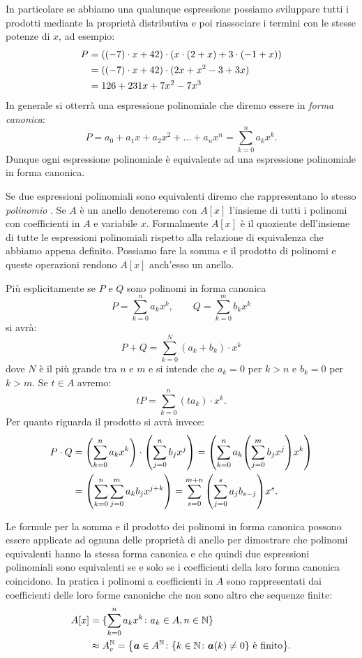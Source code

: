 In particolare se abbiamo una qualunque espressione possiamo sviluppare tutti i prodotti
mediante la proprietà distributiva e poi riassociare i termini 
con le stesse potenze di $x$, ad esempio:
\begin{align*}
P &= {\left( (-7)\cdot x+42 \right)}\cdot(x\cdot (2 + x)
+ 3\cdot(-1+x))\\
&= {\left( (-7)\cdot x + 42 \right)}\cdot (2x+x^2-3+3x) \\
&= 126 + 231 x + 7 x^2 - 7 x^3
\end{align*}
In generale si otterrà una espressione polinomiale che diremo 
essere in \emph{forma canonica}:
\[
  P = a_0 + a_1 x + a_2 x^2 + \dots + a_n x^n
       = \sum_{k=0}^n a_k x^k.
\]
Dunque ogni espressione polinomiale è equivalente ad una 
espressione polinomiale in forma canonica. 

Se due espressioni polinomiali sono equivalenti 
diremo che rappresentano lo stesso \emph{polinomio}%
%
.
Se $A$ è un anello denoteremo con 
$A[x]$ \index{$\KK[x]$}%
l'insieme di tutti i polinomi con coefficienti in $A$ e variabile $x$. 
Formalmente $A[x]$ è il quoziente dell'insieme 
di tutte le espressioni polinomiali rispetto alla relazione di equivalenza
che abbiamo appena definito. 
Possiamo fare la somma e il prodotto di polinomi e queste operazioni 
rendono $A[x]$ anch'esso un anello.

Più esplicitamente se $P$ e $Q$ sono polinomi in forma canonica
\[
  P = \sum_{k=0}^n a_k x^k, \qquad Q = \sum_{k=0}^m b_k x^k
\]
si avrà:
\[
  P + Q = \sum_{k=0}^{N} (a_k+b_k) \cdot x^k
\]
dove $N$ è il più grande tra $n$ e $m$ e si intende che $a_k=0$ per $k>n$ e 
$b_k=0$ per $k>m$.
Se $t\in A$ avremo:
\[
  t P = \sum_{k=0}^n (ta_k)\cdot x^k.
\]
Per quanto riguarda il prodotto si avrà invece:
\begin{align*}
  P\cdot Q
  &= {\left( \sum_{k=0}^n a_k x^k \right)}\cdot {\left( \sum_{j=0}^n b_j x^j \right)}
  = {\left( \sum_{k=0}^n a_k {\left( \sum_{j=0}^m b_j x^j \right)} x^k \right)} \\
  &= {\left( \sum_{k=0}^n \sum_{j=0}^m a_k b_j x^{j+k} \right)}
  = \sum_{s=0}^{m+n} {\left( \sum_{j=0}^s a_j b_{s-j} \right)} x^s.
\end{align*}

Le formule per la somma e il prodotto dei polinomi in forma canonica 
possono essere applicate ad ognuna delle proprietà di anello per dimostrare
che polinomi equivalenti hanno la stessa forma canonica e che quindi 
due espressioni polinomiali sono equivalenti se e solo se i coefficienti 
della loro forma canonica coincidono.
In pratica i polinomi a coefficienti in $A$ sono 
rappresentati dai coefficienti delle loro forme canoniche che 
non sono altro che sequenze finite:
\begin{align*}
  A[x] 
  &= \{\sum_{k=0}^n a_k x^k\colon a_k\in A, n\in {\mathbb N}\}\\
  &\approx A^{\mathbb N}_c 
  = {\left\{ \boldsymbol a \in A^{\mathbb N}\colon {\left\{ k\in {\mathbb N}\colon \boldsymbol a(k)\neq 0 \right\}} \text{ è finito} \right\}}.  
\end{align*}

